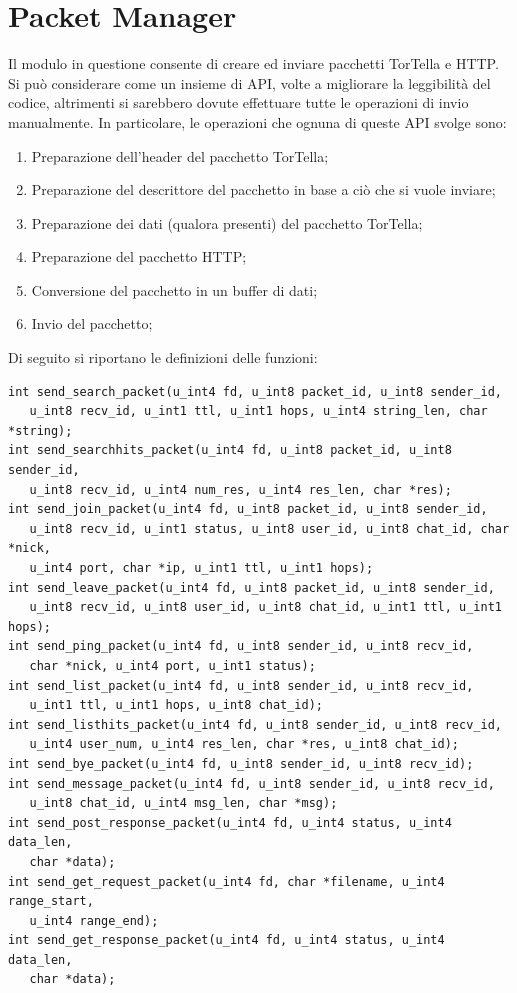\section{Packet Manager}
Il modulo in questione consente di creare ed inviare pacchetti TorTella e HTTP. Si può considerare come un insieme di API, volte a migliorare la leggibilità del codice, altrimenti si sarebbero dovute effettuare tutte le operazioni di invio manualmente. In particolare, le operazioni che ognuna di queste API svolge sono:
\begin{enumerate}
\item Preparazione dell'header del pacchetto TorTella; 
\item Preparazione del descrittore del pacchetto in base a ciò che si vuole inviare;
\item Preparazione dei dati (qualora presenti) del pacchetto TorTella;
\item Preparazione del pacchetto HTTP;
\item Conversione del pacchetto in un buffer di dati;
\item Invio del pacchetto;
\end{enumerate}
Di seguito si riportano le definizioni delle funzioni:
\begin{lstlisting}[frame=trBL]
int send_search_packet(u_int4 fd, u_int8 packet_id, u_int8 sender_id,
   u_int8 recv_id, u_int1 ttl, u_int1 hops, u_int4 string_len, char *string);
int send_searchhits_packet(u_int4 fd, u_int8 packet_id, u_int8 sender_id,
   u_int8 recv_id, u_int4 num_res, u_int4 res_len, char *res);
int send_join_packet(u_int4 fd, u_int8 packet_id, u_int8 sender_id,
   u_int8 recv_id, u_int1 status, u_int8 user_id, u_int8 chat_id, char *nick,
   u_int4 port, char *ip, u_int1 ttl, u_int1 hops);
int send_leave_packet(u_int4 fd, u_int8 packet_id, u_int8 sender_id, 
   u_int8 recv_id, u_int8 user_id, u_int8 chat_id, u_int1 ttl, u_int1 hops);
int send_ping_packet(u_int4 fd, u_int8 sender_id, u_int8 recv_id, 
   char *nick, u_int4 port, u_int1 status);
int send_list_packet(u_int4 fd, u_int8 sender_id, u_int8 recv_id,
   u_int1 ttl, u_int1 hops, u_int8 chat_id);
int send_listhits_packet(u_int4 fd, u_int8 sender_id, u_int8 recv_id,
   u_int4 user_num, u_int4 res_len, char *res, u_int8 chat_id);
int send_bye_packet(u_int4 fd, u_int8 sender_id, u_int8 recv_id);
int send_message_packet(u_int4 fd, u_int8 sender_id, u_int8 recv_id,
   u_int8 chat_id, u_int4 msg_len, char *msg);
int send_post_response_packet(u_int4 fd, u_int4 status, u_int4 data_len,
   char *data);
int send_get_request_packet(u_int4 fd, char *filename, u_int4 range_start,
   u_int4 range_end);
int send_get_response_packet(u_int4 fd, u_int4 status, u_int4 data_len,
   char *data);
\end{lstlisting}
